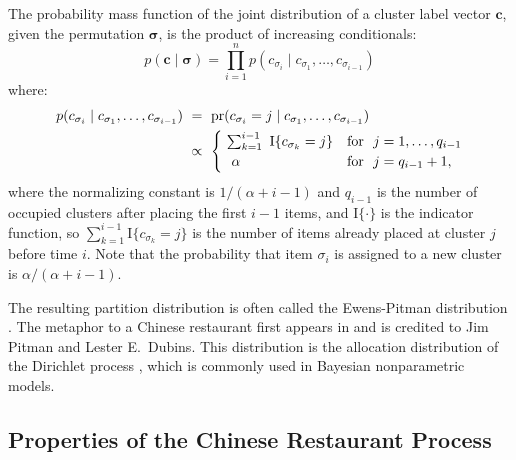 \documentclass[lineno]{biometrika-dbd}
\newcommand{\mass}{\alpha}
\newcommand{\given}{\mid}
\begin{document}
The probability mass
function of the joint distribution of a cluster label vector $\bm{c}$, given
the permutation $\bm{\sigma}$, is the product of increasing conditionals:
\begin{equation}
\label{eq_dpm_ppf}
p(\bm{c} \given \bm{\sigma}) = \prod_{i=1}^n p(c_{\sigma_i} \given c_{\sigma_1}, \ldots, c_{\sigma_{i-1}})
\end{equation}
where:
\begin{equation}
\label{eq_dpm_ppf_component}
\begin{split}
p(c_{\sigma_i} \given c_{\sigma_1},\ldots,c_{\sigma_{i-1}}) 
  & \ = \ \text{pr}(c_{\sigma_i} = j \given c_{\sigma_1},\ldots,c_{\sigma_{i-1}}) \\
  & \ \propto \
\begin{cases}
\ \sum_{k=1}^{i-1} \ \text{I}\{c_{\sigma_k} = j\} & \text{for\
\ } j=1,\ldots,q_{i-1} \\
\ \ \mass & \text{for\ \ } j = q_{i-1} + 1,
\end{cases}
\end{split}
\end{equation}
where the normalizing constant is $1/( \mass + i - 1 )$ and $q_{i-1}$ is the
number of occupied clusters after placing the first $i-1$ items, and
$\text{I}\{ \cdot \}$ is the indicator function, so $\sum_{k=1}^{i-1}
\text{I}\{c_{\sigma_k} = j\}$ is the number of items already placed at
cluster $j$ before time $i$.  Note that the probability that item $\sigma_i$ is
assigned to a new cluster is $\mass / ( \mass + i - 1)$.

The resulting partition distribution is often called the Ewens-Pitman
distribution \citep{ewens:1972,pitm:1995,pitm:1996}.  The metaphor to a Chinese
restaurant first appears in \citet[page 91-92]{aldo:1985} and is credited to
Jim Pitman and Lester E.\ Dubins.  This distribution is the allocation
distribution of the Dirichlet process \citep{ferg:1973}, which is commonly used
in Bayesian nonparametric models.

\subsection{Properties of the Chinese Restaurant Process}
\label{sec_cr_exchangeability}
\end{document}
